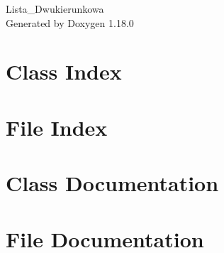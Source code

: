 \documentclass[twoside]{book}
\newcommand{\+}{\discretionary{\mbox{\scriptsize$\hookleftarrow$}}{}{}}
\newcommand{\clearemptydoublepage}{%
    \newpage{\pagestyle{empty}\cleardoublepage}%
  }
\begin{document}
  \raggedbottom
    \hypersetup{pageanchor=false,
                bookmarksnumbered=true,
                pdfencoding=unicode
               }
  \begin{titlepage}
  \vspace*{7cm}
  \begin{center}%
  {\Large Lista\+\_\+\+Dwukierunkowa}\\
  \vspace*{1cm}
  {\large Generated by Doxygen 1.18.0}\\
  \end{center}
  \end{titlepage}
  \clearemptydoublepage
  \tableofcontents
  \clearemptydoublepage
  \hypersetup{pageanchor=true}
\chapter{Class Index}

\chapter{File Index}

\chapter{Class Documentation}




\chapter{File Documentation}




  \backmatter
  \newpage
  \clearemptydoublepage
  \printindex
\end{document}
